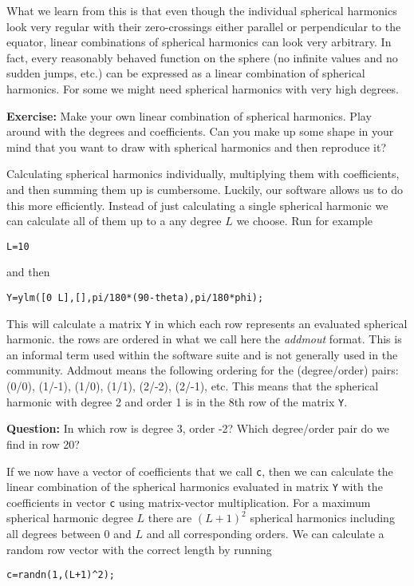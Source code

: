 \documentclass[11pt]{article}
\begin{document}
What we learn from this is that even though the individual spherical
harmonics look very regular with their zero-crossings either parallel
or perpendicular to the equator, linear combinations of spherical
harmonics can look very arbitrary. In fact, every reasonably behaved
function on the sphere (no infinite values and no sudden jumps, etc.)
can be expressed as a linear combination of spherical harmonics. For
some we might need spherical harmonics with very high degrees.

\textbf{Exercise:} Make your own linear combination of spherical
harmonics. Play around with the degrees and coefficients. Can you make
up some shape in your mind that you want to draw with spherical
harmonics and then reproduce it?

Calculating spherical harmonics individually, multiplying them with
coefficients, and then summing them up is cumbersome. Luckily, our
software allows us to do this more efficiently. Instead of just
calculating a single spherical harmonic we can calculate all of them
up to a any degree $L$ we choose. Run for example

\quad \verb+L=10+

and then

\quad \verb+Y=ylm([0 L],[],pi/180*(90-theta),pi/180*phi);+

This will calculate a matrix \verb+Y+ in which each row represents an
evaluated spherical harmonic. the rows are ordered in what we call
here the \emph{addmout} format. This is an informal term used within
the software suite and is not generally used in the community. Addmout
means the following ordering for the (degree/order) pairs: (0/0),
(1/-1), (1/0), (1/1), (2/-2), (2/-1), etc. This means that the
spherical harmonic with degree 2 and order 1 is in the 8th row of the
matrix \verb+Y+.
   
\textbf{Question:} In which row is degree 3, order -2? Which
degree/order pair do we find in row 20?

If we now have a vector of coefficients that we call \verb+c+, then we
can calculate the linear combination of the spherical harmonics
evaluated in matrix \verb+Y+ with the coefficients in vector \verb+c+
using matrix-vector multiplication. For a maximum spherical harmonic
degree $L$ there are $(L+1)^2$ spherical harmonics including all
degrees between 0 and $L$ and all corresponding orders.  We can
calculate a random row vector with the correct length by running

\quad \verb!c=randn(1,(L+1)^2);!
   
\end{document}
